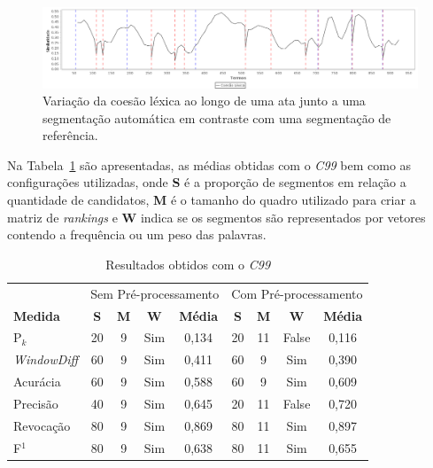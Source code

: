   \begin{figure}[!h]
	  \centering
	  \includegraphics[width=\textwidth]{conteudo/capitulos/figs/coesaolexicaTT-50-9.png}
	  \caption{Variação da coesão léxica ao longo de uma ata junto a uma segmentação automática em contraste com uma segmentação de referência.}
	  \label{fig:coesaolexicaTT}
  \end{figure}




Na Tabela~\ref{tab:resultadosc99} são apresentadas, as médias obtidas com o \textit{C99} bem como as configurações utilizadas, onde \textbf{S} é a proporção de segmentos em relação a quantidade de candidatos, \textbf{M} é o tamanho do quadro utilizado para criar a matriz de \textit{rankings} e \textbf{W} indica se os segmentos são representados por vetores contendo a frequência ou um peso das palavras.


\begin{table}[!h]
	\centering
	\begin{tabular}{|l||c|c|c|c||c|c|c|c|} \hline

		& \multicolumn{4}{c||}{Sem Pré-processamento} 
		& \multicolumn{4}{c|}{Com Pré-processamento}\\			

		\textbf{Medida} & 
		\textbf{S} & 
		\textbf{M} & 
		\textbf{W} & 
		\textbf{Média} &
		\textbf{S} & 
		\textbf{M} & 
		\textbf{W} & 
		\textbf{Média} \\	\hline

		P$_k$				& 20 & 9 & Sim & 0,134& 20 & 11 & False	& 0,116 \\ \hline  
		\textit{WindowDiff}	& 60 & 9 & Sim & 0,411& 60 &  9 & Sim 	& 0,390 \\ \hline  
		Acurácia			& 60 & 9 & Sim & 0,588& 60 &  9 & Sim 	& 0,609 \\ \hline  
		Precisão			& 40 & 9 & Sim & 0,645& 20 & 11 & False	& 0,720 \\ \hline  
		Revocação			& 80 & 9 & Sim & 0,869& 80 & 11 & Sim 	& 0,897 \\ \hline  
		F$^1$				& 80 & 9 & Sim & 0,638& 80 & 11 & Sim 	& 0,655 \\ \hline  

	\end{tabular}
	\caption{Resultados obtidos com o \textit{C99}}
	\label{tab:resultadosc99}
\end{table}



